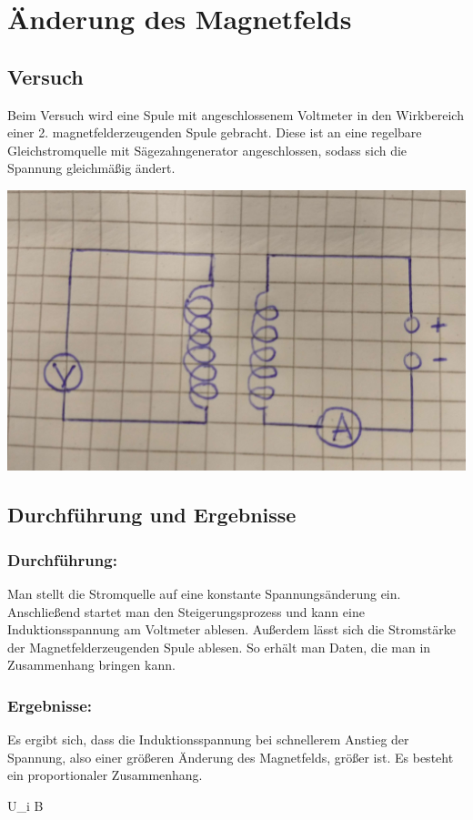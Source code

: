 \documentclass{article}
\begin{document}

\section{Änderung des Magnetfelds}

\subsection{Versuch}

\begin{multicols}{2}
    Beim Versuch wird eine Spule mit angeschlossenem Voltmeter in den Wirkbereich
    einer 2. magnetfelderzeugenden Spule gebracht. Diese ist an eine regelbare
    Gleichstromquelle mit Sägezahngenerator angeschlossen, sodass sich die
    Spannung gleichmäßig ändert.

    \columnbreak
    \begin{center}
        \includegraphics[width=.4\textwidth]{./images/induktion_versuch_spulen_haendisch.jpg}
    \end{center}

\end{multicols}

\subsection{Durchführung und Ergebnisse}

\begin{multicols}{2}

    \subsubsection{Durchführung:}

    Man stellt die Stromquelle auf eine konstante Spannungsänderung ein.
    Anschließend startet man den Steigerungsprozess und kann eine Induktionsspannung
    am Voltmeter ablesen. Außerdem lässt sich die Stromstärke der Magnetfelderzeugenden
    Spule ablesen. So erhält man Daten, die man in Zusammenhang bringen kann.
    \columnbreak

    \subsubsection{Ergebnisse:}
    Es ergibt sich, dass die Induktionsspannung bei schnellerem Anstieg der Spannung,
    also einer größeren Änderung des Magnetfelds, größer ist.
    Es besteht ein proportionaler Zusammenhang.

    \begin{formulas}
        U_{i} \propto \Delta B
    \end{formulas}

\end{multicols}
\end{document}
